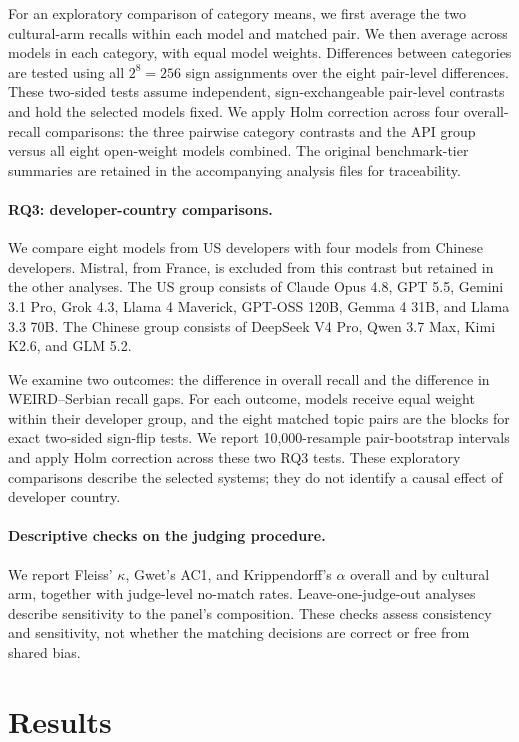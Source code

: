 For an exploratory comparison of category means, we first average
the two cultural-arm recalls within each model and matched pair. We then
average across models in each category, with equal model weights. Differences
between categories are tested using all $2^8=256$ sign assignments over the
eight pair-level differences. These two-sided tests assume independent,
sign-exchangeable pair-level contrasts and hold the selected models fixed.
We apply Holm correction across four overall-recall comparisons: the three
pairwise category contrasts and the API group versus all eight open-weight
models combined. The original benchmark-tier summaries are retained in
the accompanying analysis files for traceability.

\paragraph{RQ3: developer-country comparisons.}
We compare eight models from US developers with four models from Chinese
developers. Mistral, from France, is excluded from this contrast but retained
in the other analyses. The US group consists of Claude Opus 4.8, GPT 5.5,
Gemini 3.1 Pro, Grok 4.3, Llama 4 Maverick, GPT-OSS 120B, Gemma 4 31B,
and Llama 3.3 70B. The Chinese group consists of DeepSeek V4 Pro,
Qwen 3.7 Max, Kimi K2.6, and GLM 5.2.

We examine two outcomes: the difference in overall recall and the
difference in WEIRD--Serbian recall gaps. For each outcome, models receive
equal weight within their developer group, and the eight matched topic
pairs are the blocks for exact two-sided sign-flip tests. We report
10,000-resample pair-bootstrap intervals and apply Holm correction across
these two RQ3 tests. These exploratory comparisons describe the selected
systems; they do not identify a causal effect of developer country.

\paragraph{Descriptive checks on the judging procedure.}
We report Fleiss' $\kappa$, Gwet's AC1, and Krippendorff's $\alpha$
overall and by cultural arm, together with judge-level no-match rates.
Leave-one-judge-out analyses describe sensitivity to the panel's composition.
These checks assess consistency and sensitivity, not whether the matching
decisions are correct or free from shared bias.

\section{Results}
